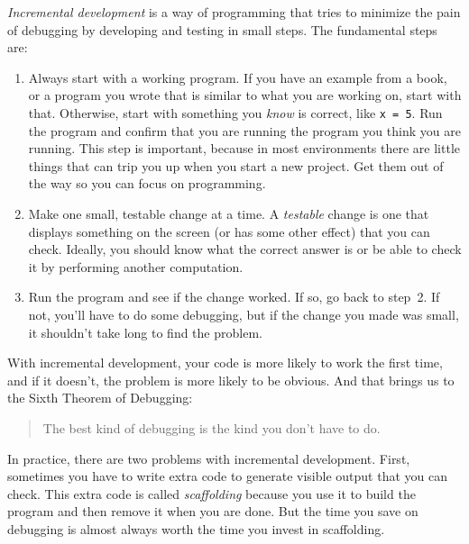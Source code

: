 \emph{Incremental development} is a way of programming that tries
to minimize the pain of debugging by developing and testing in small steps.  The fundamental steps are:

\begin{enumerate}

\item Always start with a working program.  If you have an
example from a book, or a program you wrote that is similar to
what you are working on, start with that.  Otherwise, start with
something you \emph{know}  is correct, like \lstinline{x = 5}.  Run the program
and confirm that you are running the program you think you are
running.
This step is important, because in most environments there
are little things that can trip you up when you start a new
project.  Get them out of the way so you can focus on programming.

\item Make one small, testable change at a time.  A \emph{testable}
change is one that displays something on the screen (or has some
other effect) that you can check.  Ideally, you should know what
the correct answer is or be able to check it by performing another
computation.

\item Run the program and see if the change worked.  If so, go back
to step~2.  If not, you'll have to do some debugging, but if the
change you made was small, it shouldn't take long to find the problem.

\end{enumerate}


With incremental development, your code is more likely to work the first time, and if it doesn't, the problem is more likely to be obvious.  And that brings us to the Sixth Theorem of Debugging:

\begin{quote}
The best kind of debugging is the kind you don't have to do.
\end{quote}

In practice, there are two problems with incremental development.
First, sometimes you have to write extra code to
generate visible output that you can check.  This extra code is
called \emph{scaffolding} because you use it to build the program
and then remove it when you are done.  But the time you save on
debugging is almost always worth the time you invest in
scaffolding.

